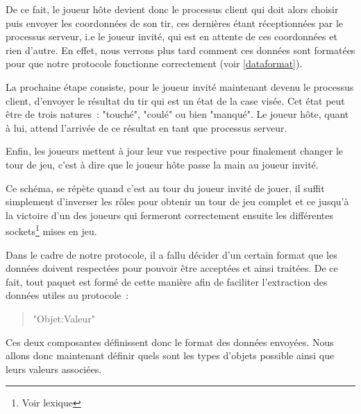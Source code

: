 			De ce fait, le joueur hôte devient donc le processus client qui doit alors choisir puis envoyer les coordonnées de son tir, ces dernières étant réceptionnées par le processus serveur, i.e le joueur invité, qui est en attente de ces coordonnées et rien d'autre. En effet, nous verrons plus tard comment ces données sont formatées pour que notre protocole fonctionne correctement (voir \ref{dataformat}).  \newline
			
			La prochaine étape consiste, pour le joueur invité maintenant devenu le processus client, d'envoyer le résultat du tir qui est un état de la case visée. Cet état peut être de trois natures~: "touché", "coulé" ou bien "manqué". Le joueur hôte, quant à lui, attend l'arrivée de ce résultat en tant que processus serveur.\newline \label{states}
			
			Enfin, les joueurs mettent à jour leur vue respective pour finalement changer le tour de jeu, c'est à dire que le joueur hôte passe la main au joueur invité. \newline
			
			Ce schéma, se répète quand c'est au tour du joueur invité de jouer, il suffit simplement d'inverser les rôles pour obtenir un tour de jeu complet et ce jusqu'à la victoire d'un des joueurs qui fermeront correctement ensuite les différentes sockets\footnote{Voir lexique} mises en jeu.
			
		\label{dataformat}
			Dans le cadre de notre protocole, il a fallu décider d'un certain format que les données doivent respectées pour pouvoir être acceptées et ainsi traitées. De ce fait, tout paquet est formé de cette manière afin de faciliter l'extraction des données utiles au protocole~:
			\begin{quote}
				"Objet:Valeur"
			\end{quote}
			Ces deux composantes définissent donc le format des données envoyées. Nous allons donc maintenant définir quels sont les types d'objets possible ainsi que leurs valeurs associées.
			
